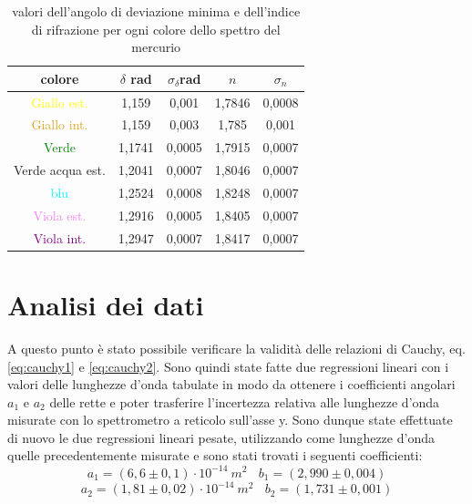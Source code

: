 \documentclass{article}
\begin{document}
        \begin{table}[H]

            \centering
            \begin{tabular}{ c c c c c  }

                \toprule 
                \textbf{colore} & $\delta$ rad & $\sigma_{\delta}$rad & $n$ & $\sigma_n$   \\
                
                \midrule
                \textcolor{yellow}{Giallo est.}	        &   1,159	&	0,001	&	1,7846 &   0,0008\\
                \textcolor{Goldenrod}{Giallo int.}      &   1,159	&	0,003	&	1,785  &   0,001 \\
                \textcolor{green}{Verde}                &   1,1741	&	0,0005	&	1,7915 &   0,0007\\
                \textcolor{Emerald}{Verde acqua est.}	&   1,2041	&	0,0007	&	1,8046 &	  0,0007\\
                \textcolor{cyan}{blu}                   &   1,2524	&	0,0008	&	 1,8248 &	  0,0007\\
                \textcolor{violet}{Viola est.}          &   1,2916	&	0,0005	&	1,8405 &	  0,0007\\
                \textcolor{purple}{Viola int.}	        &   1,2947	&	0,0007	&	 1,8417 &	  0,0007\\
                \bottomrule

            \end{tabular}

            \caption{valori dell'angolo di deviazione minima e dell'indice di rifrazione per ogni colore dello spettro del mercurio}
            \label{tabular:misure delta e n}

        \end{table}


    \section{Analisi dei dati}

        A questo punto è stato possibile verificare la validità delle relazioni di Cauchy, eq. \ref{eq:cauchy1} e \ref{eq:cauchy2}.
        Sono quindi state fatte due regressioni lineari con i valori delle lunghezze d'onda tabulate in modo da ottenere i coefficienti angolari $a_1$ e $a_2$
        delle rette e poter trasferire l'incertezza relativa alle lunghezze d'onda misurate con lo spettrometro a reticolo sull'asse y. 
        Sono dunque state effettuate di nuovo le due regressioni lineari pesate, utilizzando come lunghezze d'onda quelle precedentemente misurate e 
        sono stati trovati i seguenti coefficienti:
        \[a_1 = (6,6 \pm 0,1) \cdot 10^{-14}\ m^2\ \ \ \ b_1 = (2,990 \pm 0,004)\]
        \[a_2 = (1,81 \pm 0,02) \cdot 10^{-14}\ m^2\ \ \ \ b_2 = (1,731 \pm 0,001)\]
\end{document}
